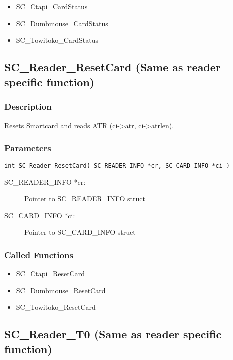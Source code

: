 \documentclass[a4paper,oneside]{article}
\begin{document}
\begin{itemize}
\item SC\_Ctapi\_CardStatus
\item SC\_Dumbmouse\_CardStatus
\item SC\_Towitoko\_CardStatus
\end{itemize}


\subsection{SC\_Reader\_ResetCard (Same as reader specific function)}

\subsubsection*{Description}

Resets Smartcard and reads ATR (ci->atr, ci->atrlen).

\subsubsection*{Parameters}

\begin{verbatim}
int SC_Reader_ResetCard( SC_READER_INFO *cr, SC_CARD_INFO *ci )
\end{verbatim}

\begin{description}
\item[SC\_READER\_INFO *cr:] Pointer to SC\_READER\_INFO struct
\item[SC\_CARD\_INFO *ci:] Pointer to SC\_CARD\_INFO struct
\end{description}

\subsubsection*{Called Functions}

\begin{itemize}
\item SC\_Ctapi\_ResetCard
\item SC\_Dumbmouse\_ResetCard
\item SC\_Towitoko\_ResetCard
\end{itemize}


\subsection{SC\_Reader\_T0 (Same as reader specific function)}
\end{document}
